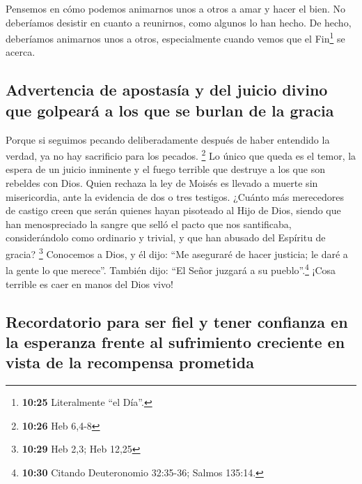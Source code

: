  Pensemos en cómo podemos animarnos unos a otros a amar y
hacer el bien.  No deberíamos desistir en cuanto a
reunirnos, como algunos lo han hecho. De hecho, deberíamos animarnos
unos a otros, especialmente cuando vemos que el Fin\footnote{\textbf{10:25}
  Literalmente ``el Día''.} se acerca.

\hypertarget{advertencia-de-apostasuxeda-y-del-juicio-divino-que-golpearuxe1-a-los-que-se-burlan-de-la-gracia}{%
\subsection{Advertencia de apostasía y del juicio divino que golpeará a
los que se burlan de la
gracia}\label{advertencia-de-apostasuxeda-y-del-juicio-divino-que-golpearuxe1-a-los-que-se-burlan-de-la-gracia}}

 Porque si seguimos pecando deliberadamente después de
haber entendido la verdad, ya no hay sacrificio para los pecados.
\footnote{\textbf{10:26} Heb 6,4-8}  Lo único que queda
es el temor, la espera de un juicio inminente y el fuego terrible que
destruye a los que son rebeldes con Dios.  Quien rechaza
la ley de Moisés es llevado a muerte sin misericordia, ante la evidencia
de dos o tres testigos.  ¿Cuánto más merecedores de
castigo creen que serán quienes hayan pisoteado al Hijo de Dios, siendo
que han menospreciado la sangre que selló el pacto que nos santificaba,
considerándolo como ordinario y trivial, y que han abusado del Espíritu
de gracia? \footnote{\textbf{10:29} Heb 2,3; Heb 12,25} 
Conocemos a Dios, y él dijo: ``Me aseguraré de hacer justicia; le daré a
la gente lo que merece''. También dijo: ``El Señor juzgará a su
pueblo''.\footnote{\textbf{10:30} Citando Deuteronomio 32:35-36; Salmos
  135:14.}  ¡Cosa terrible es caer en manos del Dios
vivo!

\hypertarget{recordatorio-para-ser-fiel-y-tener-confianza-en-la-esperanza-frente-al-sufrimiento-creciente-en-vista-de-la-recompensa-prometida}{%
\subsection{Recordatorio para ser fiel y tener confianza en la esperanza
frente al sufrimiento creciente en vista de la recompensa
prometida}\label{recordatorio-para-ser-fiel-y-tener-confianza-en-la-esperanza-frente-al-sufrimiento-creciente-en-vista-de-la-recompensa-prometida}}


